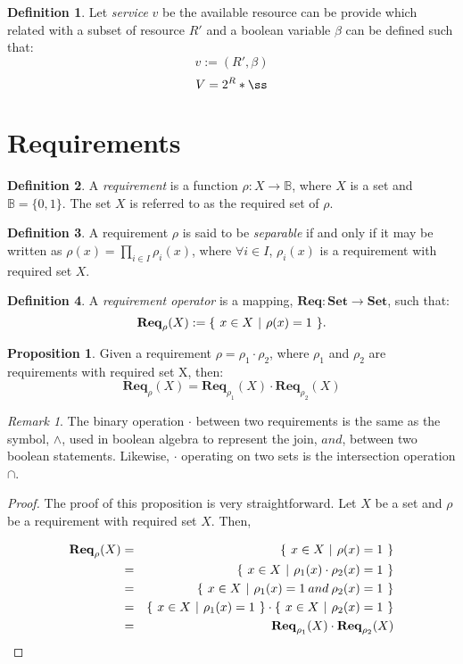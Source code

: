 \documentclass{article}
\theoremstyle{definition}
\newtheorem{definition}{Definition}[section]
\newtheorem{proposition}{Proposition}[section]
\theoremstyle{remark}
\newtheorem*{remark}{Remark}
\newcommand{\reqfunc}[2]{#1:#2\rightarrow\mathbb{B}}
\newcommand{\reqop}[2]{\mathbf{Req}_{#1}(#2)}
\newcommand{\setbuild}[3]
{
	\{\hspace{0.05in} 
	#1 \in #2 \hspace{0.05in} 
	| \hspace{0.05in}#3\hspace{0.05in}
	\}	
}
\begin{document}
		\begin{definition}
			Let \emph{service} $v$ be the available resource can be provide which related with a subset of resource $R'$ and a boolean variable $\beta$ can be defined such that:
			\[
			v := (R', \beta)
			\]
			\[
			V = 2^{R}*{\ss}
			\]
		\end{definition}
	
	\section{Requirements}
	
		\begin{definition}
			A \emph{requirement} is a function $\reqfunc{\rho}{X}$, where $X$ is a set and $\mathbb{B} = \{0,1\}$. The set $X$ is referred to as the required set of $\rho$.
		\end{definition}
		
		\begin{definition}
			A requirement $\rho$ is said to be \emph{separable} if and only if it may be written as $\rho(x) = \prod_{i \in I}{\rho_{i}(x)}$, where $\forall i \in I$, $\rho_{i}(x)$ is a requirement with required set $X$.
		\end{definition}
		
		\begin{definition}
			A \emph{requirement operator} is a mapping, $\mathbf{Req}: \mathbf{Set} \rightarrow \mathbf{Set}$, such that: \[\reqop{\rho}{X} := \setbuild{x}	{X}{\rho(x) = 1}.\]
		\end{definition}
		
		\begin{proposition}
			Given a requirement $\rho = \rho_{1}\cdot\rho_{2}$, where $\rho_{1}$ and $\rho_{2}$ are requirements with required set X, then: 
			\[
			\reqop{\rho}{X}\stackrel{~}{=}\reqop{\rho_{1}}{X}\cdot\reqop{\rho_{2}}{X}
			\]
		\end{proposition}
		
		\begin{remark}
			The binary operation $\cdot$ between two requirements is the same as the symbol, $\wedge$, used in boolean algebra to represent the join, $and$, between two boolean statements. Likewise, $\cdot$ operating on two sets is the intersection operation $\cap$. 
		\end{remark}
		
		\begin{proof}
			The proof of this proposition is very straightforward. Let $X$ be a set and $\rho$ be a requirement with required set $X$. Then,
			
			\begin{eqnarray}
			\reqop{\rho}{X} & = & \setbuild{x}{X}{\rho(x) = 1}\\ 
			& = & \setbuild{x}{X}{\rho_{1}(x)\cdot\rho_{2}(x) = 1}\\ 
			& = & \setbuild{x}{X}{\rho_{1}(x) = 1 \mathbin{and} \rho_{2}(x) = 1}\\ 
			& = & \setbuild{x}{X}{\rho_{1}(x) = 1}\cdot\setbuild{x}{X}{\rho_{2}(x) = 1}\\
			& = & \reqop{\rho_{1}}{X}\cdot\reqop{\rho_{2}}{X}
			\end{eqnarray}
		\end{proof}
	
\end{document}
